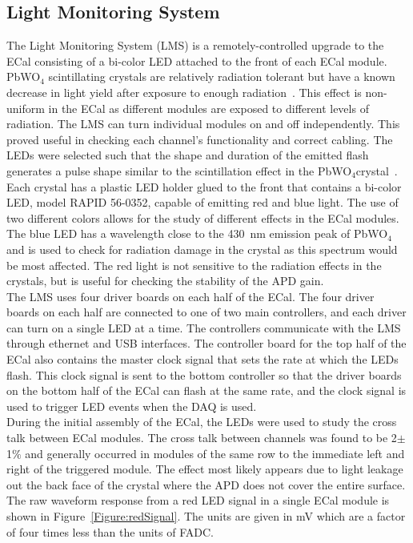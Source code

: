 \subsection{Light Monitoring System}
The Light Monitoring System (LMS) is a remotely-controlled upgrade to the ECal consisting of a bi-color LED attached to the front of each ECal module. PbWO$_4$ scintillating crystals are relatively radiation tolerant but have a known decrease in light yield after exposure to enough radiation~\cite{Batarin2005543}. This effect is non-uniform in the ECal as different modules are exposed to different levels of radiation. The LMS can turn individual modules on and off independently. This proved useful in checking each channel's functionality and correct cabling. The LEDs were selected such that the shape and duration of the emitted flash generates a pulse shape similar to the scintillation effect in the PbWO$_4$crystal~\cite{battaglieri_ft_clas12}.\\
\indent Each crystal has a plastic LED holder glued to the front that contains a bi-color LED, model RAPID 56-0352, capable of emitting red and blue light. The use of two different colors allows for the study of different effects in the ECal modules. The blue LED has a wavelength close to the 430~nm emission peak of PbWO$_4$  \cite{battaglieri_ft_clas12} and is used to check for radiation damage in the crystal as this spectrum would be most affected. The red light is not sensitive to the radiation effects in the crystals, but is useful for checking the stability of the  APD gain.\\ 
\indent The LMS uses four driver boards on each half of the ECal. The four driver boards on each half are connected to one of two main controllers, and each driver can turn on a single LED at a time. The controllers communicate with the LMS through ethernet and USB interfaces. The controller board for the top half of the ECal also contains the master clock signal that sets the rate at which the LEDs flash. This clock signal is sent to the bottom controller so that the driver boards on the bottom half of the ECal can flash at the same rate, and the clock signal is used to trigger LED events when the DAQ is used.\\
\indent During the initial assembly of the ECal, the LEDs were used to study the cross talk between ECal modules. The cross talk between channels was found to be 2$\pm$1$\%$ and generally occurred in modules of the same row to the immediate left and right of the triggered module. The effect most likely appears due to light leakage out the back face of the crystal where the APD does not cover the entire surface. The raw waveform response from a red LED signal in a single ECal module is shown in Figure~\ref{Figure:redSignal}. The units are given in mV which are a factor of four times less than the units of FADC.

